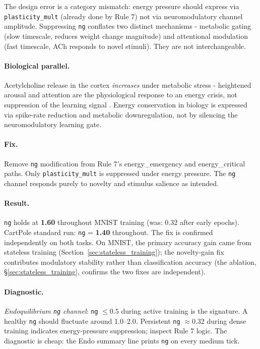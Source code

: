 The design error is a category mismatch: energy pressure should express via \texttt{plasticity\_mult} (already done by Rule 7) not via neuromodulatory channel amplitude. Suppressing \texttt{ng} conflates two distinct mechanisms - metabolic gating (slow timescale, reduces weight change magnitude) and attentional modulation (fast timescale, ACh responds to novel stimuli). They are not interchangeable.

\paragraph{Biological parallel.}
Acetylcholine release in the cortex \emph{increases} under metabolic stress - heightened arousal and attention are the physiological response to an energy crisis, not suppression of the learning signal \cite{hasselmo1995neuromodulation}. Energy conservation in biology is expressed via spike-rate reduction and metabolic downregulation, not by silencing the neuromodulatory learning gate.

\paragraph{Fix.}
Remove \texttt{ng} modification from Rule 7's energy\_emergency and energy\_critical paths. Only \texttt{plasticity\_mult} is suppressed under energy pressure. The \texttt{ng} channel responds purely to novelty and stimulus salience as intended.

\paragraph{Result.}
\texttt{ng} holds at \textbf{1.60} throughout MNIST training (was: 0.32 after early epochs). CartPole standard run: \texttt{ng} = \textbf{1.40} throughout. The fix is confirmed independently on both tasks. On MNIST, the primary accuracy gain came from stateless training (Section~\ref{sec:stateless_training}); the novelty-gain fix contributes modulatory stability rather than classification accuracy (the ablation, §\ref{sec:stateless_training}, confirms the two fixes are independent).

\paragraph{Diagnostic.}
\emph{Endoquilibrium \texttt{ng} channel}: \texttt{ng} $\leq 0.5$ during active training is the signature. A healthy \texttt{ng} should fluctuate around 1.0--2.0. Persistent \texttt{ng} $\approx 0.32$ during dense training indicates energy-pressure suppression; inspect Rule 7 logic. The diagnostic is cheap: the Endo summary line prints \texttt{ng} on every medium tick.

